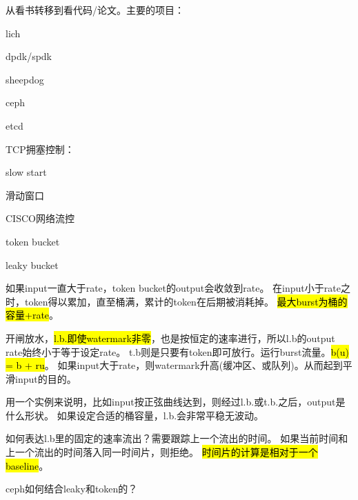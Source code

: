 从看书转移到看代码/论文。主要的项目：
\begin{enumbox}
\item lich
\item dpdk/spdk
\item sheepdog
\item ceph
\item etcd
\end{enumbox}

TCP拥塞控制：
\begin{enumbox}
\item slow start
\item 滑动窗口
\end{enumbox}

CISCO网络流控
\begin{enumbox}
\item token bucket
\item leaky bucket
\end{enumbox}

如果input一直大于rate，token bucket的output会收敛到rate。
在input小于rate之时，token得以累加，直至桶满，累计的token在后期被消耗掉。
\hl{最大burst为桶的容量+rate}。

开闸放水，\hl{l.b.即使watermark非零}，也是按恒定的速率进行，所以l.b的output rate始终小于等于设定rate。
t.b则是只要有token即可放行。运行burst流量。\hl{b(u) = b + ru}。
如果input大于rate，则watermark升高(缓冲区、或队列)。从而起到平滑input的目的。

用一个实例来说明，比如input按正弦曲线达到，则经过l.b.或t.b.之后，output是什么形状。
如果设定合适的桶容量，l.b.会非常平稳无波动。

如何表达l.b里的固定的速率流出？需要跟踪上一个流出的时间。
如果当前时间和上一个流出的时间落入同一时间片，则拒绝。
\hl{时间片的计算是相对于一个baseline}。

ceph如何结合leaky和token的？
